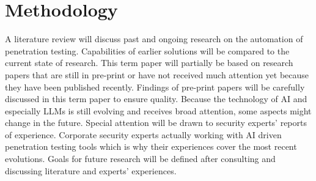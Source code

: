 %
%
\section{Methodology}
\label{sec:intro:methodology}
A literature review will discuss past and ongoing research on the automation of penetration testing. Capabilities of earlier solutions will be compared to the current state of research. This term paper will partially be based on research papers that are still in pre-print or have not received much attention yet because they have been published recently. Findings of pre-print papers will be carefully discussed in this term paper to ensure quality. Because the technology of \ac{AI} and especially \ac{LLM}s is still evolving and receives broad attention, some aspects might change in the future. Special attention will be drawn to security experts' reports of experience. Corporate security experts actually working with \ac{AI} driven penetration testing tools which is why their experiences cover the most recent evolutions. Goals for future research will be defined after consulting and discussing literature and experts' experiences.
